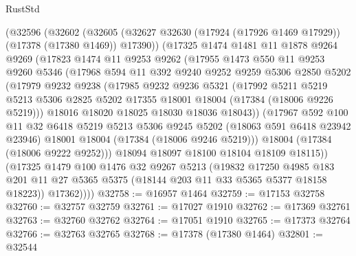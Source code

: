 \begin{lexlean}{RustStd}
\begin{coremodule}
    (@32596
      (@32602
        (@32605 (@32627 @32630 (@17924 (@17926 @1469 @17929)) (@17378 (@17380 @1469)) @17390))
        (@17325
          @1474
          @1481
          @11
          @1878
          @9264
          @9269
          (@17823
            @1474
            @11
            @9253
            @9262
            (@17955
              @1473
              @550
              @11
              @9253
              @9260
              @5346
              (@17968
                @594
                @11
                @392
                @9240
                @9252
                @9259
                @5306
                @2850
                @5202
                (@17979
                  @9232
                  @9238
                  (@17985
                    @9232
                    @9236
                    @5321
                    (@17992
                      @5211
                      @5219
                      @5213
                      @5306
                      @2825
                      @5202
                      @17355
                      @18001
                      @18004
                      (@17384 (@18006 @9226 @5219)))
                    @18016
                    @18020
                    @18025
                    @18030
                    @18036
                    @18043))
                (@17967
                  @592
                  @100
                  @11
                  @32
                  @6418
                  @5219
                  @5213
                  @5306
                  @9245
                  @5202
                  (@18063 @591 @6418 @23942 @23946)
                  @18001
                  @18004
                  (@17384 (@18006 @9246 @5219)))
                @18004
                (@17384 (@18006 @9222 @9252)))
              @18094
              @18097
              @18100
              @18104
              @18109
              @18115))
          (@17325
            @1479
            @100
            @1476
            @32
            @9267
            @5213
            (@19832
              @17250
              @4985
              @183
              @201
              @11
              @27
              @5365
              @5375
              (@18144 @203 @11 @33 @5365 @5377 @18158 @18223))
            @17362))))
@32758 := @16957 @1464
@32759 := @17153 @32758
@32760 := @32757 @32759
@32761 := @17027 @1910
@32762 := @17369 @32761
@32763 := @32760 @32762
@32764 := @17051 @1910
@32765 := @17373 @32764
@32766 := @32763 @32765
@32768 := @17378 (@17380 @1464)
@32801 := @32544

\end{coremodule}
\end{lexlean}
